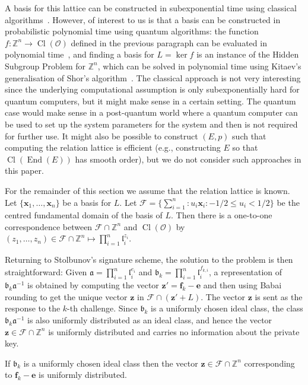\documentclass{llncs}
\newcommand{\FF}{\mathcal{F}}
\newcommand{\OO}{\mathcal{O}}
\newcommand{\Z}{\mathbb{Z}}
\DeclareMathOperator{\End}{End}
\DeclareMathOperator{\Cl}{Cl}
\renewcommand{\a}{\mathfrak{a}}
\renewcommand{\b}{\mathfrak{b}}
\renewcommand{\l}{\mathfrak{l}}
\newcommand{\e}{\mathbf{e}}
\newcommand{\f}{\mathbf{f}}
\newcommand{\x}{\mathbf{x}}
\newcommand{\z}{\mathbf{z}}
\begin{document}
A basis for this lattice can be constructed in subexponential time using classical algorithms~\cite{hafner1989rigorous,biasse_fieker_jacobson_2016}.
However, of interest to us is that a basis can be constructed
in probabilistic polynomial time using quantum algorithms: the function $f:\Z^n\to\Cl(\OO)$ 
defined in the previous paragraph
can be evaluated in polynomial time~\cite{shanks1989gauss,Cohen1993}, and finding a basis for $L=\ker f$ is an instance of the Hidden Subgroup Problem for $\Z^n$, which can be solved in polynomial time using Kitaev's generalisation of Shor's algorithm~\cite{kitaev1995hsp}.
The classical approach is not very interesting since the underlying computational assumption is only subexponentially hard for quantum computers, but it might make sense in a certain setting.
The quantum case would make sense in a post-quantum world where a quantum computer can be used to set up the system parameters for the system and then is not required for further use.
It might also be possible to construct $(E, p )$ such that computing the relation lattice is efficient (e.g., constructing $E$ so that $\Cl( \End(E))$ has smooth order), but we do not consider such approaches in this paper.

For the remainder of this section we assume that the relation lattice is known.
Let $\{ \x_1, \dots, \x_n \}$ be a basis for $L$.
Let $\FF = \{ \sum_{i=1}^n : u_i \x_i : -1/2 \le u_i < 1/2 \}$ be the centred fundamental domain of the basis of $L$.
Then there is a one-to-one correspondence between $\FF \cap \Z^n$ and $\Cl(\OO)$ by
$(z_1, \dots, z_n ) \in \FF \cap \Z^n  \mapsto \prod_{i=1}^n \l_i^{z_i}$.



Returning to Stolbunov's signature scheme, the solution to the problem is then straightforward:
Given $\a = \prod_{i=1}^n \l_i^{e_i}$ and $\b_k = \prod_{i=1}^n \l_i^{f_{k,i}}$,
a representation of $\b_k \a^{-1}$ is obtained by computing the vector $\z' = \f_k - \e$
and then using Babai rounding to get the unique vector $\z$ in $\FF \cap (\z' + L )$.
The vector $\z$ is sent as the response to the $k$-th challenge.
Since $\b_k$ is a uniformly chosen ideal class, the class $\b_k \a^{-1}$ is also uniformly distributed as an ideal class, and hence the vector $\z \in \FF \cap \Z^n$ is uniformly distributed and carries no information about the private key.

\begin{lemma}
If $\b_k$ is a uniformly chosen ideal class then the vector 
$\z \in \FF \cap \Z^n$ corresponding to $\f_k - \e$ is uniformly distributed.
\end{lemma}
\end{document}

